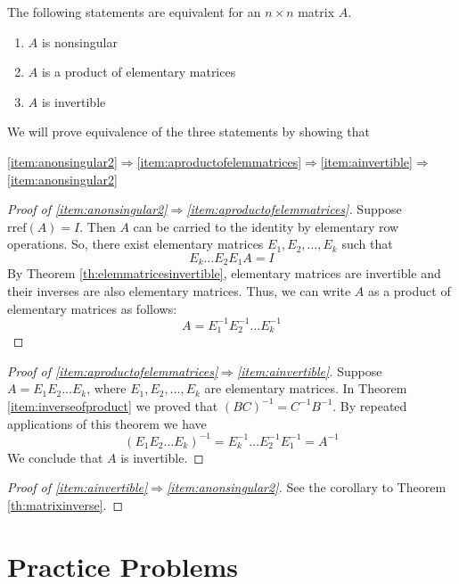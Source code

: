 \documentclass{ximera}
\begin{document}
\begin{theorem}\label{th:elemmatrices}
The following statements are equivalent for an $n\times n$ matrix $A$.
\begin{enumerate}
\item\label{item:anonsingular2} $A$ is nonsingular
\item\label{item:aproductofelemmatrices} $A$ is a product of elementary matrices
\item\label{item:ainvertible} $A$ is invertible
\end{enumerate}
\end{theorem}
We will prove equivalence of the three statements by showing that
\begin{center}
\ref{item:anonsingular2}$\Rightarrow$\ref{item:aproductofelemmatrices}$\Rightarrow$\ref{item:ainvertible}$\Rightarrow$\ref{item:anonsingular2}
\end{center}
\begin{proof}[Proof of \ref{item:anonsingular2}$\Rightarrow$\ref{item:aproductofelemmatrices}]
Suppose $\mbox{rref}(A)=I$.  Then $A$ can be carried to the identity by elementary row operations.  So, there exist elementary matrices $E_1, E_2, \ldots ,E_k$ such that 
$$E_k\ldots E_2E_1A=I$$
By Theorem \ref{th:elemmatricesinvertible}, elementary matrices are invertible and their inverses are also elementary matrices.  Thus, we can write $A$ as a product of elementary matrices as follows:
$$A=E_1^{-1}E_2^{-1}\ldots E_k^{-1}$$
\end{proof}
\begin{proof}[Proof of \ref{item:aproductofelemmatrices}$\Rightarrow$\ref{item:ainvertible}]
Suppose $A=E_1E_2\ldots E_k$, where $E_1, E_2, \ldots , E_k$ are elementary matrices.  In Theorem \ref{item:inverseofproduct} we proved that $(BC)^{-1} = C^{-1} B^{-1}$.  By repeated applications of this theorem we have
$$(E_1E_2\ldots E_k)^{-1}=E_k^{-1}\ldots E_2^{-1}E_1^{-1}=A^{-1}$$
We conclude that $A$ is invertible.
\end{proof}
\begin{proof}[Proof of \ref{item:ainvertible}$\Rightarrow$\ref{item:anonsingular2}]
See the corollary to Theorem \ref{th:matrixinverse}.
\end{proof}




\section*{Practice Problems}
\end{document}
